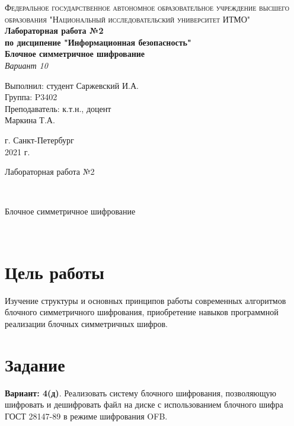 \documentclass[12pt, a4paper]{article}
\begin{document}
\begin{titlepage}
\begin{center}

\textsc{Федеральное государственное автономное образовательное учреждение высшего\\
образования "Национальный исследовательский университет ИТМО"}
\vfill
\textbf{Лабораторная работа №2\\[4mm]
по дисципение "Информационная безопасность"\\[4mm]
Блочное симметричное шифрование\\[4mm]
}
\textit{Вариант 10\\[20mm]}
\begin{flushright}
Выполнил: студент Саржевский И.А.
\\[2mm]Группа: P3402\\[4mm]
Преподаватель: к.т.н., доцент\\
Маркина Т.А.
\end{flushright}
\vfill
г. Санкт-Петербург\\[2mm]
2021 г.

\end{center}
\end{titlepage}

\begin{huge}Лабораторная работа №2\end{huge}\\[4mm]
\begin{Large}Блочное симметричное шифрование\end{Large}\\

\section*{Цель работы}

Изучение структуры и основных принципов работы современных алгоритмов
блочного симметричного шифрования, приобретение навыков программной
реализации блочных симметричных шифров.

\section*{Задание}

\textbf{Вариант: 4(д)}. Реализовать систему блочного шифрования,
позволяющую шифровать и дешифровать файл на диске с использованием
блочного шифра ГОСТ 28147-89 в режиме шифрования OFB.
\end{document}
